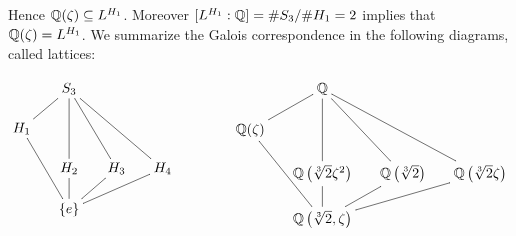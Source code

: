 \documentclass[twoside = false,	%
		headsepline,		%
		parskip = true,
		]{scrbook}						%
\begin{document}
    	Hence $\mathbb Q(\zeta) \subseteq L^{H_1}$. Moreover $[L^{H_1}:\mathbb Q] = \#S_3/\#H_1 = 2$ implies that $\mathbb Q(\zeta) = L^{H_1}$.
    	We summarize the Galois correspondence in the following diagrams, called lattices:
	
    	\begin{equation*}
    	    \begin{split}
        	    \xymatrix@R=0.5cm @C=0.5cm
        	    {
        	            & S_3\ar@{-}[dl] \ar@{-}[dd] \ar@{-}[ddr] \ar@{-}[ddrr] & \\
        	        H_1\ar@{-}[ddr] &     & \\
        	            & H_2\ar@{-}[d] & H_3\ar@{-}[dl] & H_4\ar@{-}[dll] \\
        	            & \{e\}
        	    } \qquad  \qquad
        	    \xymatrix@R=0.5cm @C=0.5cm
        	    {
        	            & \Q \ar@{-}[dl] \ar@{-}[dd] \ar@{-}[ddr] \ar@{-}[ddrr] & \\
        	        \Q(\zeta)\ar@{-}[ddr] &     & \\
        	            & \Q\round{\sqrt[3]{2}\zeta^2}\ar@{-}[d] & \Q\round{\sqrt[3]{2}}\ar@{-}[dl] & \Q\round{\sqrt[3]{2}\zeta}\ar@{-}[dll] \\
        	            & \Q\round{\sqrt[3]{2},\zeta}
        	    }	   
    	    \end{split}
    	\end{equation*}
	
\end{document}

